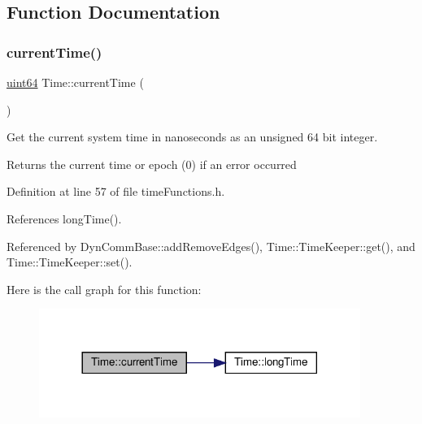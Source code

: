 \subsection{Function Documentation}
\mbox{\label{namespaceTime_ae414566445c9d392bb148cc98fe2cece}} 
\subsubsection{\texorpdfstring{current\+Time()}{currentTime()}}
{\footnotesize\ttfamily \hyperlink{systemDefines_8h_abc0f5bc07737e498f287334775dff2b6}{uint64} Time\+::current\+Time (\begin{DoxyParamCaption}{ }\end{DoxyParamCaption})\hspace{0.3cm}{\ttfamily [inline]}}



Get the current system time in nanoseconds as an unsigned 64 bit integer. 

\begin{DoxyReturn}{Returns}
the current time or epoch (0) if an error occurred 
\end{DoxyReturn}


Definition at line 57 of file time\+Functions.\+h.



References long\+Time().



Referenced by Dyn\+Comm\+Base\+::add\+Remove\+Edges(), Time\+::\+Time\+Keeper\+::get(), and Time\+::\+Time\+Keeper\+::set().

Here is the call graph for this function\+:
\nopagebreak
\begin{figure}[H]
\begin{center}
\leavevmode
\includegraphics[width=296pt]{namespaceTime_ae414566445c9d392bb148cc98fe2cece_cgraph}
\end{center}
\end{figure}
\mbox{\label{namespaceTime_a57ff57387f9a60589ccdbe9215843ffe}} 
